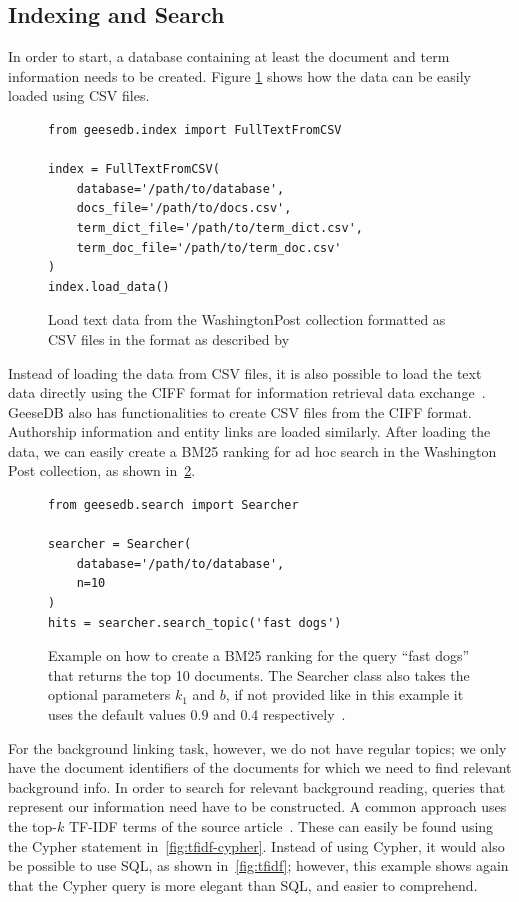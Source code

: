 \subsection{Indexing and Search}
In order to start, a database containing at least the document and term information needs to be created. Figure \ref{fig:load_text_data} shows how the data can be easily loaded using CSV files.
\begin{figure}
	\begin{verbatim}
from geesedb.index import FullTextFromCSV

index = FullTextFromCSV(
    database='/path/to/database',
    docs_file='/path/to/docs.csv',
    term_dict_file='/path/to/term_dict.csv',
    term_doc_file='/path/to/term_doc.csv'
)
index.load_data()
	\end{verbatim}
	\caption{Load text data from the WashingtonPost collection formatted as CSV files in the format as described by~\citet{OldDog}}
	\label{fig:load_text_data}
\end{figure}

Instead of loading the data from CSV files, it is also possible to load the text data directly using the CIFF format for information retrieval data exchange~\citep{ciff}. GeeseDB also has functionalities to create CSV files from the CIFF format. Authorship information and entity links are loaded similarly. After loading the data, we can easily create a BM25 ranking for ad hoc search in the Washington Post collection, as shown in~\cref{fig:code_bm25_ranking}.

\begin{figure}
	\begin{verbatim}
from geesedb.search import Searcher

searcher = Searcher(
    database='/path/to/database', 
    n=10
)
hits = searcher.search_topic('fast dogs')
	\end{verbatim}
	\caption{Example on how to create a BM25 ranking for the query ``fast dogs'' that returns the top 10 documents. The Searcher class also takes the optional parameters $k_1$ and $b$, if not provided like in this example it uses the default values $0.9$ and $0.4$ respectively~\citep{ATIRE}.}
	\label{fig:code_bm25_ranking}
\end{figure}

For the background linking task, however, we do not have regular topics; we only have the document identifiers of the documents for which we need to find relevant background info. In order to search for relevant background reading, queries that represent our information need have to be constructed. A common approach uses the top-$k$ TF-IDF terms of the source article~\citep{anserini-news}. These can easily be found using the Cypher statement in~\cref{fig:tfidf-cypher}. Instead of using Cypher, it would also be possible to use SQL, as shown in~\cref{fig:tfidf}; however, this example shows again that the Cypher query is more elegant than SQL, and easier to comprehend. 

